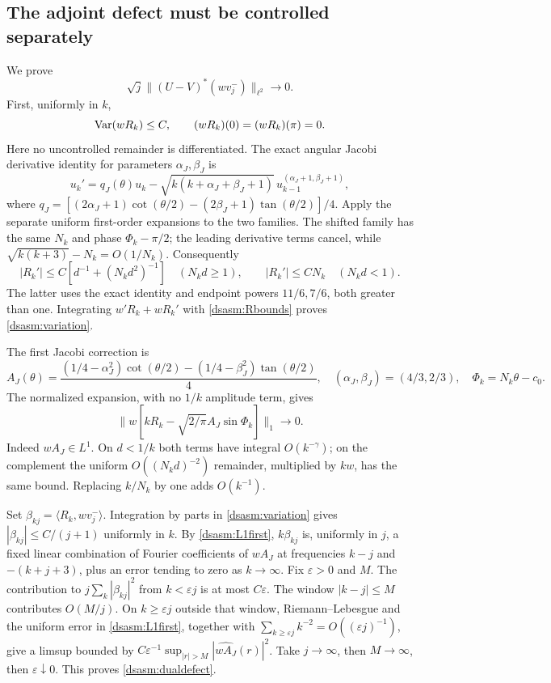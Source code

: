 \documentclass[11pt,letterpaper]{article}
\theoremstyle{remark}\newtheorem{remark}[theorem]{Remark}
\newcommand{\eps}{\varepsilon}\newcommand{\HH}{\mathcal H}\newcommand{\one}{\mathbf1}
\begin{document}
\subsection{The adjoint defect must be controlled separately}
We prove
\begin{equation}\label{dsasm:dualdefect}
 \sqrt j\|(U-V)^*(wv_j^-)\|_{\ell^2}\to0.
\end{equation}
First, uniformly in $k$,
\begin{equation}\label{dsasm:variation}
 \operatorname{Var}(wR_k)\le C,\qquad (wR_k)(0)=(wR_k)(\pi)=0.
\end{equation}
Here no uncontrolled remainder is differentiated. The exact angular
Jacobi derivative identity for parameters $\alpha_J,\beta_J$ is
\[
 u_k'=q_J(\theta)u_k-
       \sqrt{k(k+\alpha_J+\beta_J+1)}\,
                      u_{k-1}^{(\alpha_J+1,\beta_J+1)},
\]
where $q_J=[(2\alpha_J+1)\cot(\theta/2)
-(2\beta_J+1)\tan(\theta/2)]/4$.
Apply the separate uniform first-order expansions to the two families.
The shifted family has the same $N_k$ and phase $\Phi_k-\pi/2$;
the leading derivative terms cancel, while
$\sqrt{k(k+3)}-N_k=O(1/N_k)$. Consequently
\[
 |R_k'|\le C[d^{-1}+(N_kd^2)^{-1}]\quad(N_kd\ge1),\qquad
 |R_k'|\le CN_k\quad(N_kd<1).
\]
The latter uses the exact identity and endpoint powers $11/6,7/6$,
both greater than one. Integrating $w'R_k+wR_k'$ with
\eqref{dsasm:Rbounds} proves \eqref{dsasm:variation}.

The first Jacobi correction is
\[
 A_J(\theta)=\frac{(1/4-\alpha_J^2)\cot(\theta/2)
                  -(1/4-\beta_J^2)\tan(\theta/2)}4,
 \quad (\alpha_J,\beta_J)=(4/3,2/3),\quad\Phi_k=N_k\theta-c_0.
\]
The normalized expansion, with no $1/k$ amplitude term, gives
\begin{equation}\label{dsasm:L1first}
 \|w[kR_k-\sqrt{2/\pi}A_J\sin\Phi_k]\|_1\longrightarrow0.
\end{equation}
Indeed $wA_J\in L^1$. On $d<1/k$ both terms have integral
$O(k^{-\gamma})$; on the complement the uniform
$O((N_kd)^{-2})$ remainder, multiplied by $kw$, has the same bound.
Replacing $k/N_k$ by one adds $O(k^{-1})$.

Set $\beta_{kj}=\langle R_k,wv_j^-\rangle$. Integration by parts
in \eqref{dsasm:variation} gives $|\beta_{kj}|\le C/(j+1)$ uniformly
in $k$. By \eqref{dsasm:L1first}, $k\beta_{kj}$ is, uniformly in $j$,
a fixed linear combination of Fourier coefficients of $wA_J$ at
frequencies $k-j$ and $-(k+j+3)$, plus an error tending to zero
as $k\to\infty$. Fix $\eps>0$ and $M$. The contribution to
$j\sum_k|\beta_{kj}|^2$ from $k<\eps j$ is at most $C\eps$.
The window $|k-j|\le M$ contributes $O(M/j)$.
On $k\ge\eps j$ outside that window, Riemann--Lebesgue and the
uniform error in \eqref{dsasm:L1first}, together with
$\sum_{k\ge\eps j}k^{-2}=O((\eps j)^{-1})$, give a limsup
bounded by $C\eps^{-1}\sup_{|r|>M}|\widehat{wA_J}(r)|^2$.
Take $j\to\infty$, then $M\to\infty$, then $\eps\downarrow0$.
This proves \eqref{dsasm:dualdefect}.
\end{document}
